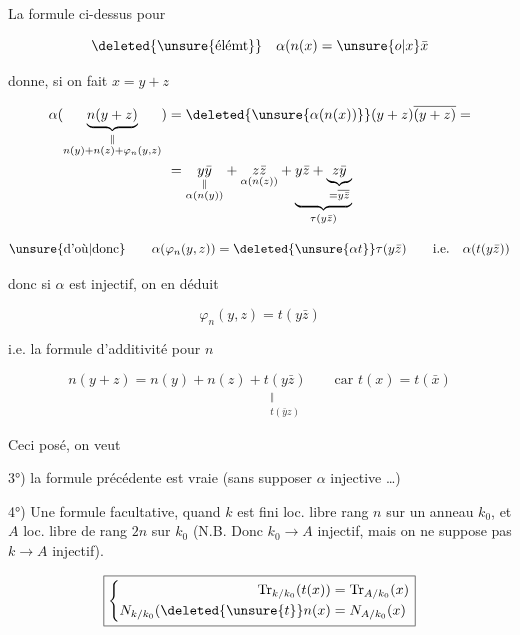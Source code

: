 
La formule ci-dessus pour

\[
\deleted{\unsure{\text{élémt}}}\quad\alpha(n(x)=\unsure{o|x}\bar x
\]

donne, si on fait $x=y+z$

\[
\begin{aligned}
\alpha(\underset{\substack{\Vert\\ n(y)+n(z)+\varphi_n(y,z)}}{\underbrace{n(y+z)}})
&=\deleted{\unsure{\alpha(n(x))}}(y+z)\overline{(y+z)}=\\
&=\underset{\substack{\Vert\\\alpha(n(y))}}{y\bar y}
+\underset{\alpha(n(z))}{z\bar z}
+\underbrace{y\bar z+\underbrace{z\bar y}_{=\overline{y\bar z}}}_{\tau(y\bar z)}
\end{aligned}
\]

\[
\text{\unsure{d'où|donc}}\qquad\alpha(\varphi_n(y,z))=\deleted{\unsure{\alpha t}}\tau(y\bar z)
\qquad\text{i.e.}\quad\alpha(t(y\bar z))
\]

donc si $\alpha$ est injectif, on en déduit

\[
\boxed{\varphi_n(y,z)=t(y\bar z)}
\]

i.e. la formule d'additivité pour $n$

\[
\boxed{n(y+z)=n(y)+n(z)+\underset{\substack{\Vert\\t(\bar yz)}}{t(y\bar z)}}
\qquad\text{car }t(x)=t(\bar x)
\]

Ceci posé, on veut

3°) la formule précédente est vraie (sans supposer $\alpha$ injective \ldots)

4°) Une formule facultative, quand $k$ est fini loc. libre  rang  $n$ sur un anneau $k_0$, et  $A$ loc. libre de rang $2n$ sur $k_0$ (N.B. Donc $k_0\longrightarrow A$ injectif, mais on ne suppose pas $k\longrightarrow A$ injectif).

\[
\boxed{\left\{\begin{aligned}
\mathrm{Tr}_{k/k_0}(t(x))&=\mathrm{Tr}_{A/k_0}(x)\\
N_{k/k_0}(\deleted{\unsure{t}}n(x)&=N_{A/k_0}(x)
\end{aligned}\right.}
\]




